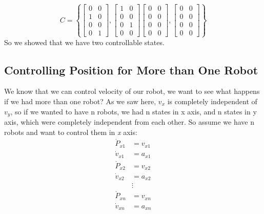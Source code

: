 \documentclass[letterpaper, 10 pt, conference]{ieeeconf}
\begin{document}
\begin{equation}
C=\left\{
\begin{bmatrix} 
0 & 0\\
1 & 0 \\
0 & 0 \\
0 & 1
\end{bmatrix}
,
\begin{bmatrix} 
1 & 0\\
0 & 0\\
0 & 1\\
0 & 0
\end{bmatrix}
\begin{bmatrix} 
0 & 0\\
0 & 0\\
0 & 0\\
0 & 0
\end{bmatrix}
,
\begin{bmatrix} 
0 & 0\\
0 & 0\\
0 & 0\\
0 & 0
\end{bmatrix}
 \right\}
\end{equation}
So we showed that we have two controllable states.


\subsection{Controlling Position for More than One Robot}
We know that we can control velocity of our robot, we want to see what happens if we had more than one robot? As we saw here, $v_x$ is completely independent of $v_y$, so if we wanted to have n robots, we had n states in x axis, and n states in y axis, which were completely independent from each other. So assume we have n robots and want to control them in \emph{x} axis:\\
\begin{align}
\dot{P}_{x1} &= v_{x1}\\\nonumber
\dot{v}_{x1} &= a_{x1}\\\nonumber
\dot{P}_{x2} &= v_{x2}\\\nonumber
\dot{v}_{x2} &= a_{x2}\\\nonumber
&\vdots\\\nonumber
\dot{P}_{xn} &= v_{xn}\\\nonumber
\dot{v}_{xn} &= a_{xn}\nonumber
\end{align}
\end{document}
